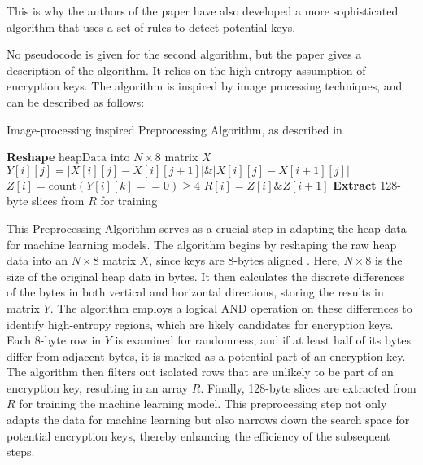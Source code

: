     This is why the authors of the paper have also developed a more sophisticated algorithm that uses a set of rules to detect potential keys.

    No pseudocode is given for the second algorithm, but the paper  gives a description of the algorithm. It relies on the high-entropy assumption of encryption keys. The algorithm is inspired by image processing techniques, and can be described as follows:

    \begin{algorithm}
        \caption{Image-processing inspired Preprocessing Algorithm, as described in  \cite{SmartKex22}}
        \begin{algorithmic}[1]
            \State \textbf{Reshape} $\text{heapData}$ into $N \times 8$ matrix $X$
                    \State $Y[i][j] = |X[i][j] - X[i][j+1]| \& |X[i][j] - X[i+1][j]|$
                    \State $Z[i] = \text{count}(Y[i][k] == 0) \geq 4$
                        \State $R[i] = Z[i] \& Z[i+1]$
                    \EndIf
                \EndFor
            \EndFor
            \State \textbf{Extract} 128-byte slices from $R$ for training
        \EndProcedure
        \end{algorithmic}
    \end{algorithm}
    
    This Preprocessing Algorithm serves as a crucial step in adapting the heap data for machine learning models. The algorithm begins by reshaping the raw heap data into an \(N \times 8\) matrix \(X\), since keys are 8-bytes aligned \cite{SmartKex22}. Here, \(N \times 8\) is the size of the original heap data in bytes. It then calculates the discrete differences of the bytes in both vertical and horizontal directions, storing the results in matrix \(Y\). The algorithm employs a logical AND operation on these differences to identify high-entropy regions, which are likely candidates for encryption keys. Each 8-byte row in \(Y\) is examined for randomness, and if at least half of its bytes differ from adjacent bytes, it is marked as a potential part of an encryption key. The algorithm then filters out isolated rows that are unlikely to be part of an encryption key, resulting in an array \(R\). Finally, 128-byte slices are extracted from \(R\) for training the machine learning model. This preprocessing step not only adapts the data for machine learning but also narrows down the search space for potential encryption keys, thereby enhancing the efficiency of the subsequent steps. 

